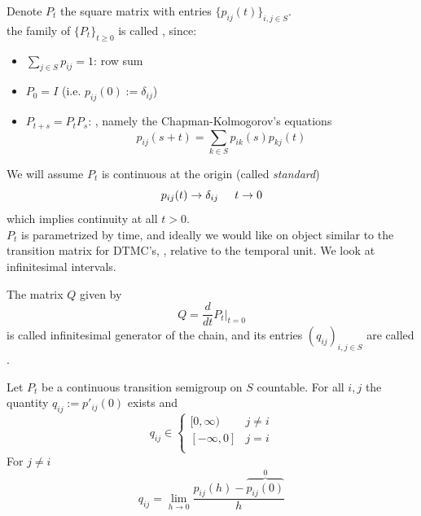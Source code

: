 \documentclass{article}
\begin{document}
	Denote $P_t$ the square matrix with entries $\{p_{ij}(t)\}_{i, j \in S}$. \\
	the family of $\{P_t\}_{t\geqslant 0}$ is called , since:
	\begin{itemize}
		\item $\sum_{j \in S} p_{ij} = 1$: row sum
		\item $P_0=I$ (i.e. $p_{ij}(0):=\delta_{ij}$)
		\item $P_{t+s}= P_t P_s$:  , namely the Chapman-Kolmogorov's equations 
		\begin{equation*}
			p_{ij}(s+t)= \sum_{k \in S} p_{ik}(s) p_{kj}(t)
		\end{equation*}
	\end{itemize}
	We will assume $P_t$ is continuous at the origin (called \textit{standard})
	\begin{equation*}
		p_{ij}(t) \rightarrow \delta_{ij} \hspace{0.5 cm} t \rightarrow 0
	\end{equation*}
	which implies continuity at all $t>0$.\\
	$P_t$ is parametrized by time, and ideally we would like on object similar to the transition matrix for DTMC's, , relative to the temporal unit. We look at infinitesimal intervals. 
	\begin{definition}
		The matrix $Q$ given by 
		\begin{equation*}
			Q= \frac{d}{dt}P_t |_{t=0}
		\end{equation*}
		is called infinitesimal generator of the chain, and its entries $(q_{ij})_{i,j \in S}$ are called .
	\end{definition}
	\begin{proposition}
		Let $P_t$ be a continuous transition semigroup on $S$ countable. For all $i,j$ the quantity $q_{ij}:=p'_{ij}(0)$ exists and 
		\[q_{ij} \in
		\begin{cases}
			[0,\infty) & j \neq i \\
			[-\infty, 0] & j = i \\
		\end{cases}
		\]
		For $j \neq i$
		\begin{equation*}
			q_{ij} = \lim_{h \rightarrow 0} \frac{p_{ij}(h) - \overbrace{p_{ij}(0)}^{0}}{h}
		\end{equation*}
	\end{proposition}
\end{document}
